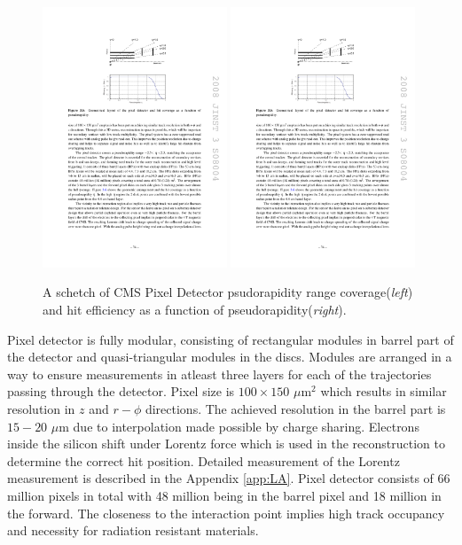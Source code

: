 \begin{figure}[htbp]
	\centering
		\includegraphics[width=0.49\textwidth]{Figures/pixel_eta.pdf}
		\includegraphics[width=0.49\textwidth]{Figures/pixel_eta2.pdf}
	\caption[CMS Pixel Detector psudorapidity range coverage and efficiency]{A schetch of CMS Pixel Detector psudorapidity range coverage(\textit{left}) and hit efficiency as a function of pseudorapidity(\textit{right}). \cite{Chatrchyan:2008aa}}
	\label{fig:pixels_eta}
\end{figure}
\par Pixel detector is fully modular, consisting of rectangular modules in barrel part of the detector and quasi-triangular modules in the discs. Modules are arranged in a way to ensure measurements in atleast three layers for each of the trajectories passing through the detector. Pixel size is $100\times150$ $\mu$m$^2$ which results in similar resolution in $z$ and $r-\phi$ directions. The achieved resolution in the barrel part is $15-20$ $\mu$m due to interpolation made possible by charge sharing. Electrons inside the silicon shift under Lorentz force which is used in the reconstruction to determine the correct hit position. Detailed measurement of the Lorentz measurement is described in the Appendix \ref{app:LA}. Pixel detector consists of 66 million pixels in total with 48 million being in the barrel pixel and 18 million in the forward. The closeness to the interaction point implies high track occupancy and necessity for radiation resistant materials. 
